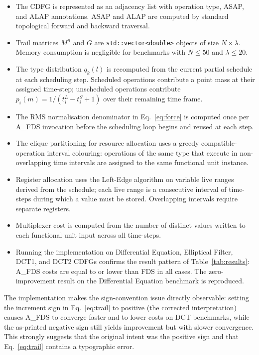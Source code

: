\documentclass[conference]{IEEEtran}
\begin{document}
\begin{itemize}
  \item The CDFG is represented as an adjacency list with operation
        type, ASAP, and ALAP annotations. ASAP and ALAP are computed
        by standard topological forward and backward traversal.
  \item Trail matrices $M^{n}$ and $G$ are
        \texttt{std::vector<double>} objects of size $N \times \lambda$.
        Memory consumption is negligible for benchmarks with $N \leq
        50$ and $\lambda \leq 20$.
  \item The type distribution $q_{k}(l)$ is recomputed from the
        current partial schedule at each scheduling step. Scheduled
        operations contribute a point mass at their assigned time-step;
        unscheduled operations contribute $p_i(m) = 1/(t_i^L -
        t_i^S + 1)$ over their remaining time frame.
  \item The RMS normalisation denominator in Eq.~\eqref{eq:force}
        is computed once per A\_FDS invocation before the scheduling
        loop begins and reused at each step.
  \item The clique partitioning for resource allocation uses a greedy
        compatible-operation interval colouring: operations of the same
        type that execute in non-overlapping time intervals are assigned
        to the same functional unit instance.
  \item Register allocation uses the Left-Edge algorithm on variable
        live ranges derived from the schedule; each live range is a
        consecutive interval of time-steps during which a value must
        be stored. Overlapping intervals require separate registers.
  \item Multiplexer cost is computed from the number of distinct
        values written to each functional unit input across all
        time-steps.
  \item Running the implementation on Differential Equation, Elliptical
        Filter, DCT1, and DCT2 CDFGs confirms the result pattern of
        Table~\ref{tab:results}: A\_FDS costs are equal to or lower
        than FDS in all cases. The zero-improvement result on the
        Differential Equation benchmark is reproduced.
\end{itemize}

The implementation makes the sign-convention issue directly observable:
setting the increment sign in Eq.~\eqref{eq:trail} to positive (the
corrected interpretation) causes A\_FDS to converge faster and to lower
costs on DCT benchmarks, while the as-printed negative sign still yields
improvement but with slower convergence. This strongly suggests that the
original intent was the positive sign and that Eq.~\eqref{eq:trail}
contains a typographic error.
\end{document}
